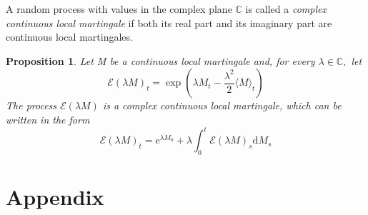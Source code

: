 \documentclass{report}
\newtheorem{proposition}{Proposition}[section]
\theoremstyle{nonumberplain}
\begin{document}
A random process with values in the complex plane $\mathbb{C}$ is called a \emph{complex continuous local martingale} if both its real part and its imaginary part are continuous local martingales.

\begin{proposition}
	Let M be a continuous local martingale and, for every $\lambda \in \mathbb{C},$ let
	\[
	\mathcal{E}(\lambda M)_{t}=\exp \left(\lambda M_{t}-\frac{\lambda^{2}}{2}\langle M\rangle_{t}\right)
	\]
	The process $\mathcal{E}(\lambda M)$ is a complex continuous local martingale, which can be written
	in the form
	\[
	\mathcal{E}(\lambda M)_{t}=\mathrm{e}^{\lambda M_{0}}+\lambda \int_{0}^{t} \mathcal{E}(\lambda M)_{s} \mathrm{d} M_{s}
	\]
\end{proposition}

\newpage

\chapter*{Appendix}
\end{document}
